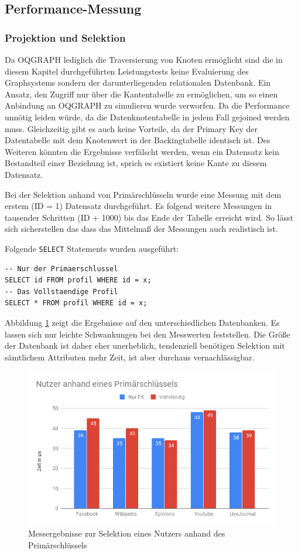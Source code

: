 \subsection{Performance-Messung}

\subsubsection{Projektion und Selektion}
Da OQGRAPH lediglich die Traversierung von Knoten ermöglicht sind die in diesem Kapitel durchgeführten Leistungstests keine Evaluierung des Graphsystems sondern der darunterliegenden relationalen Datenbank. Ein Ansatz, den Zugriff nur über die Kantentabelle zu ermöglichen, um so einen Anbindung an OQGRAPH zu simulieren wurde verworfen. Da die Performance unnötig leiden würde, da die Datenknotentabelle in jedem Fall gejoined werden muss. Gleichzeitig gibt es auch keine Vorteile, da der Primary Key der Datentabelle mit dem Knotenwert in der Backingtabelle identisch ist. Des Weiteren könnten die Ergebnisse verfälscht werden, wenn ein Datensatz kein Bestandteil einer Beziehung ist, sprich es existiert keine Kante zu diesem Datensatz.

Bei der Selektion anhand von Primärschlüsseln wurde eine Messung mit dem erstem (ID = 1) Datensatz durchgeführt. Es folgend weitere Messungen in tausender Schritten (ID + 1000) bis das Ende der Tabelle erreicht wird. So lässt sich sicherstellen das dass das Mittelmaß der Messungen auch realistisch ist.

Folgende \lstinline{SELECT} Statements wurden ausgeführt:
\begin{lstlisting}
-- Nur der Primaerschlussel
SELECT id FROM profil WHERE id = x;
-- Das Vollstaendige Profil
SELECT * FROM profil WHERE id = x;
\end{lstlisting}

Abbildung \ref{fig:NutzerPk} zeigt die Ergebnisse auf den unterschiedlichen Datenbanken. Es lassen sich nur leichte Schwankungen bei den Messwerten feststellen. Die Größe der Datenbank ist daher eher unerheblich, tendenziell benötigen Selektion mit sämtlichem Attributen mehr Zeit, ist aber durchaus vernachlässigbar.
\begin{figure}[h]
	\centering
	\includegraphics[width=\textwidth]{images/NutzerPk.png}
	\caption{Messergebnisse zur Selektion eines Nutzers anhand des Primärschlüssels}
	\label{fig:NutzerPk}
\end{figure}

